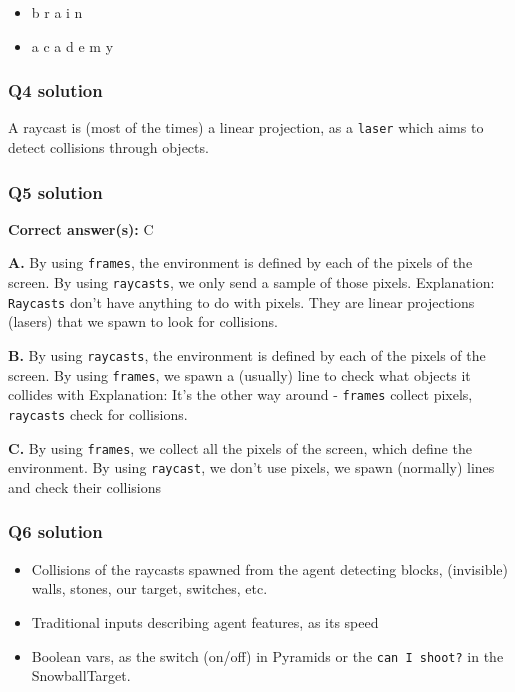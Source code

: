 \documentclass[11pt,a4paper]{article}
\begin{document}
\begin{itemize}
\tightlist
\item
  b r a i n
\item
  a c a d e m y
\end{itemize}

\subsubsection{Q4 solution}\label{q4-solution}

A raycast is (most of the times) a linear projection, as a \texttt{laser} which aims to detect collisions through objects.

\subsubsection{Q5 solution}\label{q5-solution}

\textbf{Correct answer(s):} C

\textbf{A.} By using \texttt{frames}, the environment is defined by each of the pixels of the screen. By using \texttt{raycasts}, we only send a sample of those pixels. Explanation: \texttt{Raycasts} don't have anything to do with pixels. They are linear projections (lasers) that we spawn to look for collisions.

\textbf{B.} By using \texttt{raycasts}, the environment is defined by each of the pixels of the screen. By using \texttt{frames}, we spawn a (usually) line to check what objects it collides with Explanation: It's the other way around - \texttt{frames} collect pixels, \texttt{raycasts} check for collisions.

\textbf{C.} By using \texttt{frames}, we collect all the pixels of the screen, which define the environment. By using \texttt{raycast}, we don't use pixels, we spawn (normally) lines and check their collisions

\subsubsection{Q6 solution}\label{q6-solution}

\begin{itemize}
\tightlist
\item
  Collisions of the raycasts spawned from the agent detecting blocks, (invisible) walls, stones, our target, switches, etc.
\item
  Traditional inputs describing agent features, as its speed
\item
  Boolean vars, as the switch (on/off) in Pyramids or the \texttt{can\ I\ shoot?} in the SnowballTarget.
\end{itemize}
\end{document}
